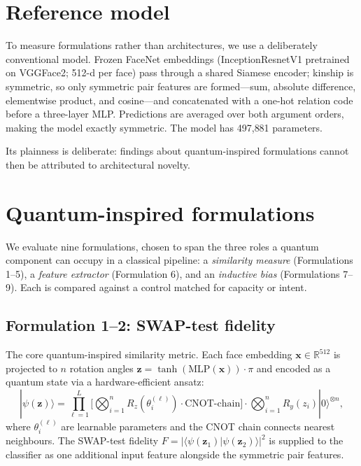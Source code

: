 \documentclass[preprint,12pt]{elsarticle}
\newcommand{\ket}[1]{|#1\rangle}
\newcommand{\braket}[2]{\langle#1|#2\rangle}
\begin{document}
\section{Reference model}
\label{sec:model}

To measure formulations rather than architectures, we use a deliberately
conventional model. Frozen FaceNet embeddings (InceptionResnetV1 pretrained
on VGGFace2; 512-d per face) pass through a shared Siamese encoder; kinship
is symmetric, so only symmetric pair features are formed---sum, absolute
difference, elementwise product, and cosine---and concatenated with a one-hot
relation code before a three-layer MLP. Predictions are averaged over both
argument orders, making the model exactly symmetric. The model has 497{,}881
parameters.

Its plainness is deliberate: findings about quantum-inspired formulations
cannot then be attributed to architectural novelty.

\section{Quantum-inspired formulations}
\label{sec:formulations}

We evaluate nine formulations, chosen to span the three roles a quantum
component can occupy in a classical pipeline: a \emph{similarity measure}
(Formulations 1--5), a \emph{feature extractor} (Formulation 6), and an
\emph{inductive bias} (Formulations 7--9). Each is compared against a control
matched for capacity or intent.

\subsection{Formulation 1--2: SWAP-test fidelity}

The core quantum-inspired similarity metric. Each face embedding $\mathbf{x}
\in \mathbb{R}^{512}$ is projected to $n$ rotation angles $\mathbf{z} =
\tanh(\text{MLP}(\mathbf{x})) \cdot \pi$ and encoded as a quantum state via a
hardware-efficient ansatz:
\begin{equation}
\ket{\psi(\mathbf{z})} = \prod_{\ell=1}^{L}
\Big[\bigotimes_{i=1}^{n} R_z(\theta_i^{(\ell)}) \cdot
\text{CNOT-chain}\Big]
\cdot \bigotimes_{i=1}^{n} R_y(z_i) \ket{0}^{\otimes n},
\end{equation}
where $\theta_i^{(\ell)}$ are learnable parameters and the CNOT chain
connects nearest neighbours. The SWAP-test fidelity
$F = |\braket{\psi(\mathbf{z}_1)}{\psi(\mathbf{z}_2)}|^2$ is supplied to
the classifier as one additional input feature alongside the symmetric pair
features.
\end{document}
